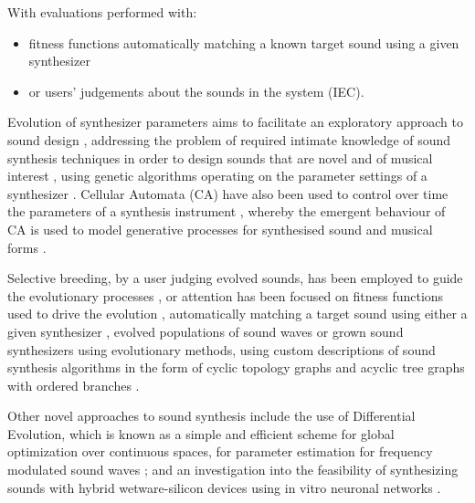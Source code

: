 \documentclass[conference]{IEEEtran}
\begin{document}
With evaluations performed with:

\begin{itemize}
	\item fitness functions automatically matching a known target sound using a given synthesizer
	\item or users’ judgements about the sounds in the system (IEC).
\end{itemize}

Evolution of synthesizer parameters aims to facilitate an exploratory approach to sound design \cite{johnson1999exploring}\cite{johnson2003exploring}, addressing the problem of required intimate knowledge of sound synthesis techniques in order to design sounds that are novel and of musical interest \cite{mandelis2001genophone}\cite{mandelis2002adaptive}, using genetic algorithms operating on the parameter settings of a synthesizer \cite{mcdermott2005toward}\cite{mcdermott2008evolutionary}\cite{horner1993machine}\cite{dahlstedt2001creating}\cite{lai2006automated}.  Cellular Automata (CA) have also been used to control over time the parameters of a synthesis instrument \cite{serquera2010evolutionary}, whereby the emergent behaviour of CA is used to model generative processes for synthesised sound and musical forms \cite{miranda2001evolving}.

Selective breeding, by a user judging evolved sounds, has been employed to guide the evolutionary processes \cite{mandelis2001genophone}\cite{mandelis2002adaptive}\cite{johnson1999exploring}\cite{johnson2003exploring}, or attention has been focused on fitness functions used to drive the evolution \cite{mcdermott2005toward}, automatically matching a target sound using either a given synthesizer \cite{mcdermott2008evolutionary}\cite{horner1993machine}\cite{lai2006automated}, evolved populations of sound waves \cite{manzolli2001evolutionary}\cite{caetano2005interactive} or grown sound synthesizers using evolutionary methods, using custom descriptions of sound synthesis algorithms in the form of cyclic topology graphs and acyclic tree graphs with ordered branches \cite{garcia2001growing}.

Other novel approaches to sound synthesis include the use of Differential Evolution, which is known as a simple and efficient scheme for global optimization over continuous spaces, for parameter estimation for frequency modulated sound waves \cite{das2009differential}; and an investigation into the feasibility of synthesizing sounds with hybrid wetware-silicon devices using in vitro neuronal networks \cite{miranda2009computer}.
\end{document}
